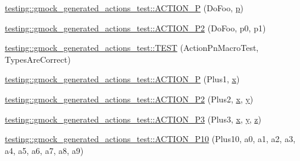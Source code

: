 \begin{DoxyCompactItemize}
\item 
\mbox{\hyperlink{namespacetesting_1_1gmock__generated__actions__test_a8487a3396f4f705e134e44584634ef1c}{testing\+::gmock\+\_\+generated\+\_\+actions\+\_\+test\+::\+A\+C\+T\+I\+O\+N\+\_\+P}} (Do\+Foo, \mbox{\hyperlink{_obj__test_2lib_2googletest-master_2googlemock_2test_2gmock-matchers__test_8cc_a6bc6b007533335efe02bafff799ec64c}{p}})
\item 
\mbox{\hyperlink{namespacetesting_1_1gmock__generated__actions__test_acd38e742235e154ad309f22e9a470a86}{testing\+::gmock\+\_\+generated\+\_\+actions\+\_\+test\+::\+A\+C\+T\+I\+O\+N\+\_\+\+P2}} (Do\+Foo, p0, p1)
\item 
\mbox{\hyperlink{namespacetesting_1_1gmock__generated__actions__test_ad702feced8b71b3708782b1a2274453e}{testing\+::gmock\+\_\+generated\+\_\+actions\+\_\+test\+::\+T\+E\+ST}} (Action\+Pn\+Macro\+Test, Types\+Are\+Correct)
\item 
\mbox{\hyperlink{namespacetesting_1_1gmock__generated__actions__test_a89c01b82e854ad79e3d139aa72477747}{testing\+::gmock\+\_\+generated\+\_\+actions\+\_\+test\+::\+A\+C\+T\+I\+O\+N\+\_\+P}} (Plus1, \mbox{\hyperlink{_obj__test_2lib_2googletest-master_2googlemock_2test_2gmock-matchers__test_8cc_a6150e0515f7202e2fb518f7206ed97dc}{x}})
\item 
\mbox{\hyperlink{namespacetesting_1_1gmock__generated__actions__test_a0e2768c0fae30bc46ec6e322b29dd54c}{testing\+::gmock\+\_\+generated\+\_\+actions\+\_\+test\+::\+A\+C\+T\+I\+O\+N\+\_\+\+P2}} (Plus2, \mbox{\hyperlink{_obj__test_2lib_2googletest-master_2googlemock_2test_2gmock-matchers__test_8cc_a6150e0515f7202e2fb518f7206ed97dc}{x}}, \mbox{\hyperlink{_obj__test_2lib_2googletest-master_2googlemock_2test_2gmock-matchers__test_8cc_a39cb44155237f0205e0feb931d5acbed}{y}})
\item 
\mbox{\hyperlink{namespacetesting_1_1gmock__generated__actions__test_afc911947c840aa9857eb2d06e4d80787}{testing\+::gmock\+\_\+generated\+\_\+actions\+\_\+test\+::\+A\+C\+T\+I\+O\+N\+\_\+\+P3}} (Plus3, \mbox{\hyperlink{_obj__test_2lib_2googletest-master_2googlemock_2test_2gmock-matchers__test_8cc_a6150e0515f7202e2fb518f7206ed97dc}{x}}, \mbox{\hyperlink{_obj__test_2lib_2googletest-master_2googlemock_2test_2gmock-matchers__test_8cc_a39cb44155237f0205e0feb931d5acbed}{y}}, \mbox{\hyperlink{_obj__test_2lib_2googletest-master_2googlemock_2test_2gmock-matchers__test_8cc_a196ff6a287f53f758b1506f21269fc77}{z}})
\item 
\mbox{\hyperlink{namespacetesting_1_1gmock__generated__actions__test_a4e48e01a7bfc369d279cc0c99a7d3c60}{testing\+::gmock\+\_\+generated\+\_\+actions\+\_\+test\+::\+A\+C\+T\+I\+O\+N\+\_\+\+P10}} (Plus10, a0, a1, a2, a3, a4, a5, a6, a7, a8, a9)

\end{DoxyCompactItemize}

